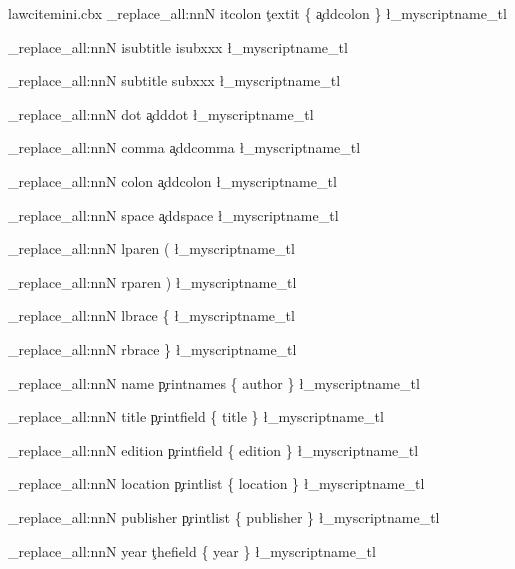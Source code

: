 \begin{filecontents*}[overwrite]{lawcitemini.cbx}
	\regex_replace_all:nnN 
							{ itcolon } 
							{ 
										\c{textit} \cB\{ \c{addcolon} \cE\}
							} 
							\l_myscriptname_tl

	\regex_replace_all:nnN 
							{ isubtitle } 
							{ 
										isubxxx
							} 
							\l_myscriptname_tl

	
	\regex_replace_all:nnN 
							{ subtitle } 
							{ 
										subxxx
							} 
							\l_myscriptname_tl

	
	\regex_replace_all:nnN 
							{ dot } 
							{ 
										\c{adddot}
							} 
							\l_myscriptname_tl
							
	\regex_replace_all:nnN 
							{ comma } 
							{ 
										\c{addcomma}
							} 
							\l_myscriptname_tl
							
	\regex_replace_all:nnN 
							{ colon } 
							{ 
										\c{addcolon}
							} 
							\l_myscriptname_tl

	\regex_replace_all:nnN 
							{ space } 
							{ 
										\c{addspace}
							} 
							\l_myscriptname_tl

	\regex_replace_all:nnN 
							{ lparen } 
							{ 
										(
							} 
							\l_myscriptname_tl

	\regex_replace_all:nnN 
							{ rparen } 
							{ 
										)
							} 
							\l_myscriptname_tl

	\regex_replace_all:nnN 
							{ lbrace } 
							{ 
										\{
							} 
							\l_myscriptname_tl

	\regex_replace_all:nnN 
							{ rbrace } 
							{ 
										\}
							} 
							\l_myscriptname_tl
							
	\regex_replace_all:nnN 
							{ name } 
							{ 
										\c{printnames} \cB\{ author \cE\}
							} 
							\l_myscriptname_tl
							
	\regex_replace_all:nnN 
							{ title } 
							{ 
										\c{printfield} \cB\{ title \cE\}
							} 
							\l_myscriptname_tl
							
	\regex_replace_all:nnN 
							{ edition } 
							{ 
										\c{printfield} \cB\{ edition \cE\}
							} 
							\l_myscriptname_tl

	\regex_replace_all:nnN 
							{ location } 
							{ 
										\c{printlist} \cB\{ location \cE\}
							} 
							\l_myscriptname_tl

	\regex_replace_all:nnN 
							{ publisher } 
							{ 
										\c{printlist} \cB\{ publisher \cE\}
							} 
							\l_myscriptname_tl
							
	\regex_replace_all:nnN 
							{ year } 
							{ 
										\c{thefield} \cB\{ year \cE\}
							} 
							\l_myscriptname_tl
							

\end{filecontents*}

